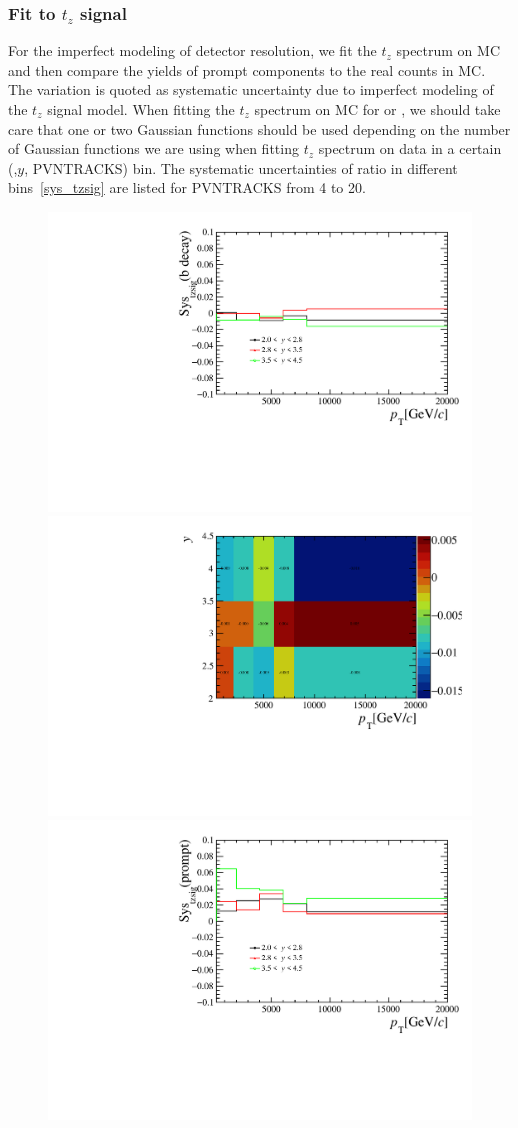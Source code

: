 \subsubsection{Fit to $t_z$ signal}
\label{sec:tzsig}
For the imperfect modeling of detector resolution, we fit the $t_z$ spectrum on MC and then 
compare the yields of prompt components to the real counts in MC. The variation is quoted as 
systematic uncertainty due to imperfect modeling of the $t_z$ signal model. When fitting the $t_z$ spectrum on MC for \jpsi or \psitwos, we should take care that one or two Gaussian functions 
should be used depending on the number of Gaussian functions we are using when fitting $t_z$ spectrum on data in a certain (\pt,$y$, PVNTRACKS) bin.
The systematic uncertainties of ratio in different bins~\ref{sys_tzsig} are 
listed for PVNTRACKS from 4 to 20.
\begin{figure}[!tbp]
    \begin{center}
      \includegraphics[width=0.49\linewidth]{pdf/SysTzPlot/tzsig/n1Errp_point.pdf}
      \includegraphics[width=0.49\linewidth]{pdf/SysTzPlot/tzsig/n1Errp.pdf}
      \vspace*{-0.5cm}
      \includegraphics[width=0.49\linewidth]{pdf/SysTzPlot/tzsig/n1Errb_point.pdf}

\end{center}
\end{figure}
